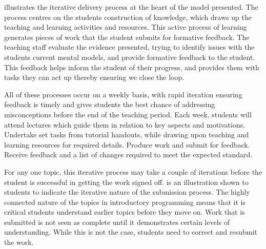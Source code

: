  illustrates the iterative delivery process at the heart of the model presented. The process centres on the students construction of knowledge, which draws up the teaching and learning activities and resources. This active process of learning generates pieces of work that the student submits for formative feedback. The teaching staff evaluate the evidence presented, trying to identify issues with the students current mental models, and provide formative feedback to the student. This feedback helps inform the student of their progress, and provides them with tasks they can act up thereby ensuring we close the loop.

All of these processes occur on a weekly basis, with rapid iteration ensuring feedback is timely and gives students the best chance of addressing misconceptions before the end of the teaching period. Each week, students will attend lectures which guide them in relation to key aspects and motivations. Undertake set tasks from tutorial handouts, while drawing upon teaching and learning resources for required details. Produce work and submit for feedback. Receive feedback and a list of changes required to meet the expected standard.

For any one topic, this iterative process may take a couple of iterations before the student is successful in getting the work signed off.  is an illustration shown to students to indicate the iterative nature of the submission process. The highly connected nature of the topics in introductory programming means that it is critical students understand earlier topics before they move on. Work that is submitted is not seen as complete until it demonstrates certain levels of understanding. While this is not the case, students need to correct and resubmit the work.

